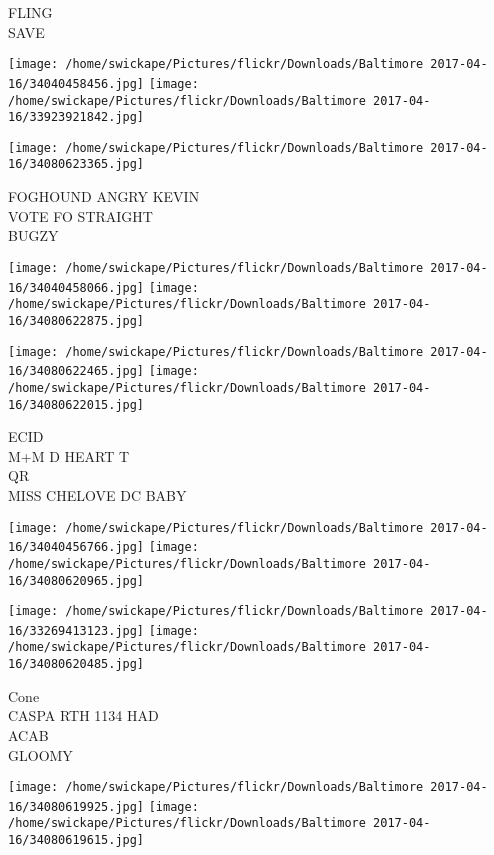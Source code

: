\documentclass[10pt,letterpaper]{article}
\begin{document}
FLING\\
SAVE\\
\pagebreak

\texttt{[image: /home/swickape/Pictures/flickr/Downloads/Baltimore 2017-04-16/34040458456.jpg]}
\texttt{[image: /home/swickape/Pictures/flickr/Downloads/Baltimore 2017-04-16/33923921842.jpg]}

\vspace{0.25in}
\texttt{[image: /home/swickape/Pictures/flickr/Downloads/Baltimore 2017-04-16/34080623365.jpg]}

FOGHOUND ANGRY KEVIN\\
VOTE FO STRAIGHT\\
BUGZY\\
\pagebreak

\texttt{[image: /home/swickape/Pictures/flickr/Downloads/Baltimore 2017-04-16/34040458066.jpg]}
\texttt{[image: /home/swickape/Pictures/flickr/Downloads/Baltimore 2017-04-16/34080622875.jpg]}

\texttt{[image: /home/swickape/Pictures/flickr/Downloads/Baltimore 2017-04-16/34080622465.jpg]}
\texttt{[image: /home/swickape/Pictures/flickr/Downloads/Baltimore 2017-04-16/34080622015.jpg]}

ECID\\
M+M D HEART T\\
QR\\
MISS CHELOVE DC BABY\\
\pagebreak

\texttt{[image: /home/swickape/Pictures/flickr/Downloads/Baltimore 2017-04-16/34040456766.jpg]}
\texttt{[image: /home/swickape/Pictures/flickr/Downloads/Baltimore 2017-04-16/34080620965.jpg]}

\texttt{[image: /home/swickape/Pictures/flickr/Downloads/Baltimore 2017-04-16/33269413123.jpg]}
\texttt{[image: /home/swickape/Pictures/flickr/Downloads/Baltimore 2017-04-16/34080620485.jpg]}

Cone\\
CASPA RTH 1134 HAD\\
ACAB\\
GLOOMY\\
\pagebreak

\texttt{[image: /home/swickape/Pictures/flickr/Downloads/Baltimore 2017-04-16/34080619925.jpg]}
\texttt{[image: /home/swickape/Pictures/flickr/Downloads/Baltimore 2017-04-16/34080619615.jpg]}
\end{document}

